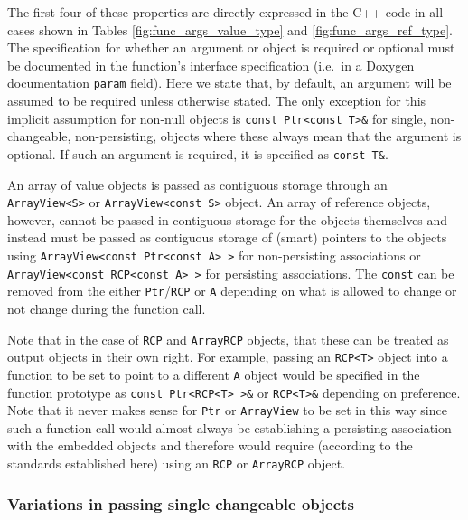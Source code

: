\documentclass[pdf,ps2pdf,11pt]{SANDreport}
\begin{document}
The first four of these properties are directly expressed in the C++
code in all cases shown in Tables {}\ref{fig:func_args_value_type} and
{}\ref{fig:func_args_ref_type}.  The specification for whether an
argument or object is required or optional must be documented in the
function's interface specification (i.e.\ in a Doxygen documentation
{}\texttt{param} field).  Here we state that, by default, an argument
will be assumed to be required unless otherwise stated.  The only
exception for this implicit assumption for non-null objects is
{}\texttt{const Ptr<const T>\&} for single, non-changeable,
non-persisting, objects where these always mean that the argument is
optional.  If such an argument is required, it is specified as
{}\texttt{const T\&}.

An array of value objects is passed as contiguous storage through an
{}\texttt{ArrayView<S>} or {}\texttt{ArrayView<const S>} object.  An
array of reference objects, however, cannot be passed in contiguous
storage for the objects themselves and instead must be passed as
contiguous storage of (smart) pointers to the objects using
{}\texttt{ArrayView<const Ptr<const A> >} for non-persisting
associations or {}\texttt{ArrayView<const RCP<const A> >} for
persisting associations.  The {}\texttt{const} can be removed from the
either {}\texttt{Ptr}/{}\texttt{RCP} or {}\texttt{A} depending on what
is allowed to change or not change during the function call.

Note that in the case of {}\texttt{RCP} and {}\texttt{ArrayRCP}
objects, that these can be treated as output objects in their own
right.  For example, passing an {}\texttt{RCP<T>} object into a
function to be set to point to a different {}\texttt{A} object would
be specified in the function prototype as {}\texttt{const Ptr<RCP<T>
>\&} or {}\texttt{RCP<T>\&} depending on preference.  Note that it
never makes sense for {}\texttt{Ptr} or {}\texttt{ArrayView} to be set
in this way since such a function call would almost always be
establishing a persisting association with the embedded objects and
therefore would require (according to the standards established here)
using an {}\texttt{RCP} or {}\texttt{ArrayRCP} object.


%
\subsubsection*{Variations in passing single changeable objects}
%
\end{document}
